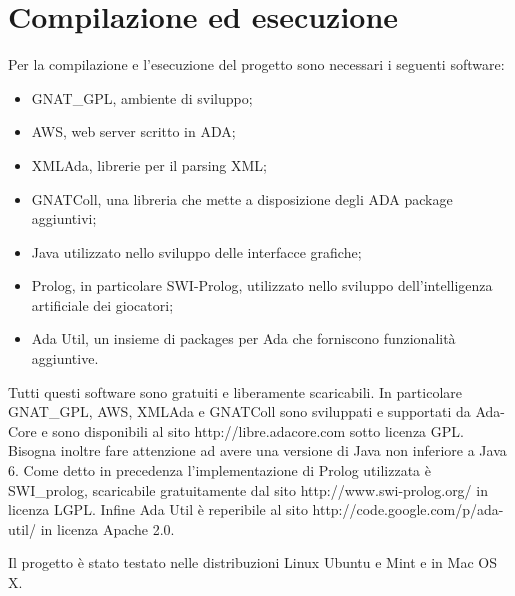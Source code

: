 
\section*{Compilazione ed esecuzione}
%
\label{sec:compilazione_esecuzione}
Per la compilazione e l'esecuzione del progetto sono necessari i seguenti software:
\begin{itemize}
\item GNAT\_GPL, ambiente di sviluppo;
\item AWS, web server scritto in ADA;
\item XMLAda, librerie per il parsing XML;
\item GNATColl, una libreria che mette a disposizione degli ADA package aggiuntivi; 
\item Java utilizzato nello sviluppo delle interfacce grafiche;
\item Prolog, in particolare SWI-Prolog, utilizzato nello sviluppo dell'intelligenza artificiale dei giocatori;
\item Ada Util, un insieme di packages per Ada che forniscono funzionalit\`{a} aggiuntive.
\end{itemize}
\noindent Tutti questi software sono gratuiti e liberamente scaricabili. In particolare GNAT\_GPL, AWS, XMLAda e GNATColl sono sviluppati e supportati da Ada-Core e sono disponibili al sito http://libre.adacore.com sotto licenza GPL. Bisogna inoltre fare attenzione ad avere una versione di Java non inferiore a Java 6. Come detto in precedenza l'implementazione di Prolog utilizzata \`{e} SWI\_prolog, scaricabile gratuitamente dal sito http://www.swi-prolog.org/ in licenza LGPL. Infine Ada Util \`{e} reperibile al sito http://code.google.com/p/ada-util/ in licenza Apache 2.0. 

Il progetto \`{e} stato testato nelle distribuzioni Linux Ubuntu e Mint e in Mac OS X.

